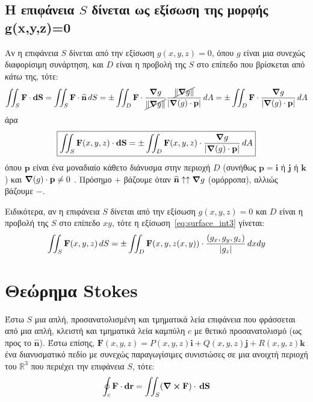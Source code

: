 \documentclass[a4paper,table]{report}
\begin{document}
\subsection*{Η επιφάνεια $S$ δίνεται ως εξίσωση της μορφής g(x,y,z)=0}
Αν η επιφάνεια $S$ δίνεται από την εξίσωση $ g(x,y,z) = 0 $, όπου $ g $ είναι μια 
συνεχώς διαφορίσιμη συνάρτηση, και $D$ είναι η προβολή της $S$ στο επίπεδο που βρίσκεται 
από \textit{κάτω} της, τότε:
\begin{equation*}
  \iint_{S} \mathbf{F}\cdot {\mathbf{dS}} = \iint_{S} \mathbf{F} \cdot 
  \mathbf{\widehat{n}} \,{dS} = 
  \pm\iint_{D} \mathbf{F} \cdot \frac{\grad{g}}{\cancel{\norm{\grad
  g}}}\frac{\cancel{\norm{\grad g}}}{\abs{\grad(g) \cdot \mathbf{p}}} \,{dA} =
  \pm\iint_{D} \mathbf{F} \cdot 
  \frac{\grad{g}}{\abs{\grad(g) \cdot \mathbf{p}}} \,{dA} 
\end{equation*}
άρα
\begin{equation}\label{eq:surface_int3}
  \boxed{\iint_{S} \mathbf{F}(x,y,z) \cdot {\mathbf{dS}} = 
    \pm\iint_{D} \mathbf{F}(x,y,z) \cdot 
  \frac{\grad{g}}{\abs{\grad(g) \cdot \mathbf{p}}} \,{dA}}
\end{equation}
όπου $ \mathbf{p} $ είναι ένα μοναδιαίο κάθετο διάνυσμα στην περιοχή $D$ (συνήθως 
$ \mathbf{p} = \mathbf{i} $ ή $ \mathbf{j} $ ή $ \mathbf{k} $) και 
$ \grad(g)\cdot \mathbf{p} \neq 0 $ .  
Πρόσημο $ + $ βάζουμε όταν $ \mathbf{\widehat{n}} \uparrow\uparrow \grad g $ (ομόρροπα), αλλιώς βάζουμε $ - $.

Ειδικότερα, αν η επιφάνεια $S$ δίνεται από την εξίσωση $ g(x,y,z) = 0 $ και $D$ είναι η
προβολή της $S$ στο επίπεδο $ xy $, τότε η εξίσωση~\eqref{eq:surface_int3} γίνεται:
\[
  \iint_{S} \mathbf{F}(x,y,z) \,{dS} = \pm\iint_{D} \mathbf{F}(x,y,z(x,y)) 
  \cdot \frac{(g_{x},g_{y},g_{z})}{\abs{g_{z}}} \,{dx}{dy} 
\]


\section{Θεώρημα Stokes}

Έστω $S$ μια απλή, προσανατολισμένη και τμηματικά λεία επιφάνεια που φράσσεται από μια απλή, κλειστή και τμηματικά λεία καμπύλη $c$ με θετικό προσανατολισμό (ως προς το 
$ \mathbf{\widehat{n}} $).  Έστω επίσης, 
$ \mathbf{F}(x,y,z) = P(x,y,z)\mathbf{i}+Q(x,y,z)\mathbf{j}+R(x,y,z)\mathbf{k} $ ένα 
διανυσματικό πεδίο με συνεχώς παραγωγίσιμες συνιστώσες σε μια ανοιχτή περιοχή του 
$ \mathbb{R}^{3} $ που περιέχει την επιφάνεια $S$, τότε:
\[
  \oint_{c} \mathbf{F} \cdot \mathbf{dr} = \iint_{S} (\curl \mathbf{F}) \cdot \,{ \mathbf{dS}} 
\]
\end{document}
